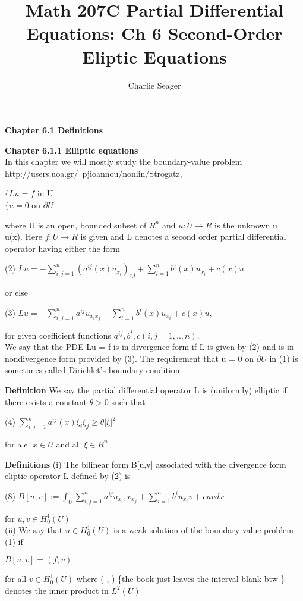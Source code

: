 \documentclass{article}
\newcommand\tab[1][1cm]{\hspace*{#1}}
\begin{document}
\title {Math 207C Partial Differential Equations: Ch 6 Second-Order Eliptic Equations}

\author{Charlie Seager}

\maketitle

\textbf {Chapter 6.1 Definitions}

\textbf {Chapter 6.1.1 Elliptic equations} \\ In this chapter we will mostly study the boundary-value problem
http://users.uoa.gr/~pjioannou/nonlin/Strogatz,
\begin{center}
$\{ Lu = f$ \tab in U \\
$ \{ u = 0$ \tab on $\partial U$
\end{center}
where U is an open, bounded subset of $R^n$ and $u: \bar{U} \to R$ is the unknown u = u(x). Here $f: U \to R$ is given and L denotes a second order partial differential operator having either the form
\begin{center}
(2) \tab $Lu = - \sum_{i,j=1}^n (a^{ij}(x)u_{x_{i}})_{xj} + \sum_{i=1}^n b^i (x) u_{x_{i}} + c(x) u$
\end{center}
or else 
\begin{center}
(3) \tab $Lu = - \sum_{i,j=1}^n a^{ij} u_{x_{i}x_{j}} + \sum_{i=1}^n b^i (x) u_{x_{i}} + c(x) u,$
\end{center}
for given coefficient functions $a^{ij}, b^i, c(i,j=1,..,n)$. \\
We say that the PDE Lu = f is in divergence form if L is given by (2) and is in nondivergence form provided by (3). The requirement that u = 0 on $\partial U$ in (1) is sometimes called Dirichlet's boundary condition.

\textbf {Definition} We say the partial differential operator L is (uniformly) elliptic if there exists a constant $\theta > 0$ such that
\begin{center}
(4) \tab $\sum_{i,j=1}^n a^{ij}(x) \xi_i \xi_j \geq \theta |\xi|^2$
\end{center}
for a.e. $x \in U$ and all $\xi \in R^n$

\textbf {Definitions} (i) The bilinear form B[u,v] associated with the divergence form eliptic operator L defined by (2) is
\begin{center}
(8) \tab $B[u,v] := \int_U \sum_{i,j=1}^n a^{ij} u_{x_{i}}, v_{x_{j}} + \sum_{i=1}^n b^i u_{x_{i}} v + cuv dx$
\end{center}
for $u, v \in H_0^1 (U)$ \\
\tab (ii) We say that $u \in H_0^1 (U)$ is a weak solution of the boundary value problem (1) if 
\begin{center}
$B[u,v] = (f,v)$
\end{center}
for all $v \in H_0^1(U)$ where ( , ) \{the book just leaves the interval blank btw \} denotes the inner product in $L^2(U)$
\end{document}

